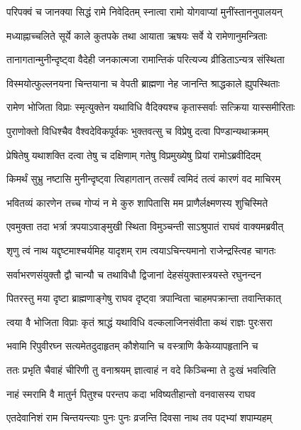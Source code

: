 \twolineshloka
{परिपक्वं च जानक्या सिद्धं रामे निवेदितम्}
{स्नात्वा रामो योगवाप्यां मुनींस्ताननुपालयन्} %

\twolineshloka
{मध्याह्नाच्चलिते सूर्ये काले कुतपके तथा}
{आयाता ऋषयः सर्वे ये रामेणानुमन्त्रिताः} %

\twolineshloka
{तानागतान्मुनीन्दृष्ट्वा वैदेही जनकात्मजा}
{रामान्तिकं परित्यज्य व्रीडिताऽन्यत्र संस्थिता} %

\twolineshloka
{विस्मयोत्फुल्लनयना चिन्तयाना च वेपती}
{ब्राह्मणा नेह जानन्ति श्राद्धकाले ह्युपस्थिताः} %

\twolineshloka
{रामेण भोजिता विप्राः स्मृत्युक्तेन यथाविधि}
{वैदिक्यश्च कृतास्सर्वाः सत्क्रिया यास्समीरिताः} %

\twolineshloka
{पुराणोक्तो विधिश्चैव वैश्वदेविकपूर्वकः}
{भुक्तवत्सु च विप्रेषु दत्वा पिण्डान्यथाक्रमम्} %

\twolineshloka
{प्रेषितेषु यथाशक्ति दत्वा तेषु च दक्षिणाम्}
{गतेषु विप्रमुख्येषु प्रियां रामोऽब्रवीदिदम्} %

\twolineshloka
{किमर्थं सुभ्रु नष्टासि मुनीन्दृष्ट्वा त्विहागतान्}
{तत्सर्वं त्वमिदं तत्वं कारणं वद माचिरम्} %

\twolineshloka
{भवितव्यं कारणेन तच्च गोप्यं न मे कुरु}
{शापितासि मम प्राणैर्लक्ष्मणस्य शुचिस्मिते} %

\twolineshloka
{एवमुक्ता तदा भर्त्रा त्रपयाऽवाङ्मुखी स्थिता}
{विमुञ्चन्ती साऽश्रुपातं राघवं वाक्यमब्रवीत्} %

\twolineshloka
{शृणु त्वं नाथ यद्दृष्टमाश्चर्यमिह यादृशम्}
{राम त्वयाऽचिन्त्यमानो राजेन्द्रस्त्विह चागतः} %

\twolineshloka
{सर्वाभरणसंयुक्तौ द्वौ चान्यौ च तथाविधौ}
{द्विजानां देहसंयुक्तास्त्रयस्ते रघुनन्दन} %

\twolineshloka
{पितरस्तु मया दृष्टा ब्राह्मणाङ्गेषु राघव}
{दृष्ट्वा त्रपान्विता चाहमपक्रान्ता तवान्तिकात्} %

\twolineshloka
{त्वया वै भोजिता विप्राः कृतं श्राद्धं यथाविधि}
{वल्कलाजिनसंवीता कथं राज्ञः पुरःसरा} %

\twolineshloka
{भवामि रिपुवीरघ्न सत्यमेतदुदाहृतम्}
{कौशेयानि च वस्त्राणि कैकेय्यापहृतानि च} %

\twolineshloka
{ततः प्रभृति चैवाहं चीरिणी तु वनाश्रयम्}
{ज्ञात्वाहं न वदे किञ्चिन्मा ते दुःखं भवत्विति} %

\twolineshloka
{नाहं स्मरामि वै मातुर्न पितुश्च परन्तप}
{कदा भविष्यतीहान्तो वनवासस्य राघव} %

\twolineshloka
{एतदेवानिशं राम चिन्तयन्त्याः पुनः पुनः}
{व्रजन्ति दिवसा नाथ तव पद्भ्यां शपाम्यहम्} %

